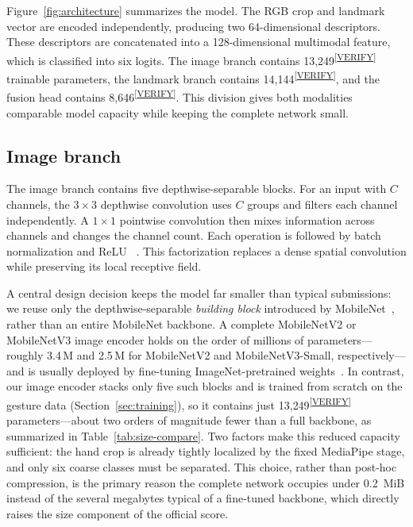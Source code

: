 \documentclass[10pt,twocolumn,a4paper]{article}
\newcommand{\evidence}[1]{\textsuperscript{\scriptsize[\hyperref[ev:#1]{#1}]}}
\newcommand{\result}[2]{#1\evidence{#2}}
\begin{document}
Figure~\ref{fig:architecture} summarizes the model. The RGB crop and landmark
vector are encoded independently, producing two 64-dimensional descriptors.
These descriptors are concatenated into a 128-dimensional multimodal feature,
which is classified into six logits. The image branch contains
\result{13,249}{VERIFY} trainable parameters, the landmark branch contains
\result{14,144}{VERIFY}, and the fusion head contains
\result{8,646}{VERIFY}. This division gives both modalities comparable model
capacity while keeping the complete network small.

\subsection{Image branch}

The image branch contains five depthwise-separable blocks. For an input with
$C$ channels, the $3\times3$ depthwise convolution uses $C$ groups and filters
each channel independently. A $1\times1$ pointwise convolution then mixes
information across channels and changes the channel count. Each operation is
followed by batch normalization and ReLU
~\cite{ioffe2015batchnorm}. This factorization replaces a dense spatial
convolution while preserving its local receptive field.

A central design decision keeps the model far smaller than typical
submissions: we reuse only the depthwise-separable \emph{building block}
introduced by MobileNet~\cite{howard2017mobilenets}, rather than an entire
MobileNet backbone. A complete MobileNetV2 or MobileNetV3 image encoder holds
on the order of millions of parameters---roughly 3.4\,M and 2.5\,M for
MobileNetV2 and MobileNetV3-Small, respectively---and
is usually deployed by fine-tuning ImageNet-pretrained
weights~\cite{sandler2018mobilenetv2,howard2019mobilenetv3}. In contrast, our
image encoder stacks only five such blocks and is trained from scratch on the
gesture data (Section~\ref{sec:training}), so it contains just
\result{13{,}249}{VERIFY} parameters---about two orders of magnitude fewer than
a full backbone, as summarized in Table~\ref{tab:size-compare}. Two factors
make this reduced capacity sufficient: the hand crop is already tightly
localized by the fixed MediaPipe stage, and only six coarse classes must be
separated. This choice, rather than post-hoc compression, is the primary reason
the complete network occupies under 0.2~MiB instead of the several megabytes
typical of a fine-tuned backbone, which directly raises the size component of
the official score.
\end{document}
